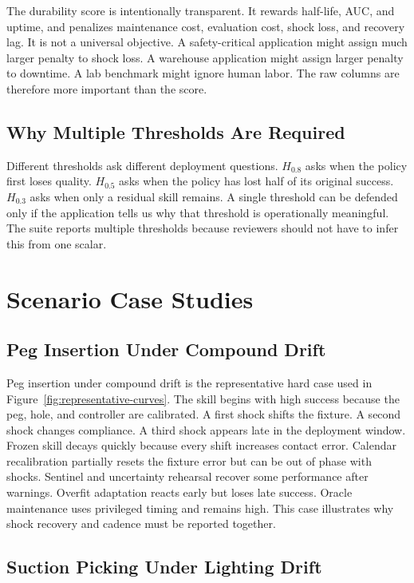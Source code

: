 \documentclass{article}
\newcommand{\life}[1]{H_{#1}}
\begin{document}
The durability score is intentionally transparent. It rewards half-life, AUC,
and uptime, and penalizes maintenance cost, evaluation cost, shock loss, and
recovery lag. It is not a universal objective. A safety-critical application
might assign much larger penalty to shock loss. A warehouse application might
assign larger penalty to downtime. A lab benchmark might ignore human labor.
The raw columns are therefore more important than the score.

\subsection{Why Multiple Thresholds Are Required}

Different thresholds ask different deployment questions. $\life{0.8}$ asks
when the policy first loses quality. $\life{0.5}$ asks when the policy has
lost half of its original success. $\life{0.3}$ asks when only a residual skill
remains. A single threshold can be defended only if the application tells us
why that threshold is operationally meaningful. The suite reports multiple
thresholds because reviewers should not have to infer this from one scalar.

\section{Scenario Case Studies}

\subsection{Peg Insertion Under Compound Drift}

Peg insertion under compound drift is the representative hard case used in
Figure~\ref{fig:representative-curves}. The skill begins with high success
because the peg, hole, and controller are calibrated. A first shock shifts the
fixture. A second shock changes compliance. A third shock appears late in the
deployment window. Frozen skill decays quickly because every shift increases
contact error. Calendar recalibration partially resets the fixture error but
can be out of phase with shocks. Sentinel and uncertainty rehearsal recover
some performance after warnings. Overfit adaptation reacts early but loses late
success. Oracle maintenance uses privileged timing and remains high. This case
illustrates why shock recovery and cadence must be reported together.

\subsection{Suction Picking Under Lighting Drift}
\end{document}
